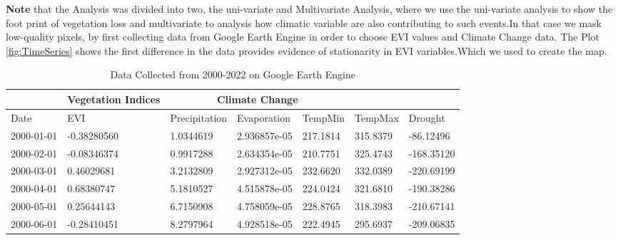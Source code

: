 \textbf{Note} that the Analysis was divided into two, the uni-variate and Multivariate Analysis, where we use the uni-variate analysis to show the foot print of vegetation loss and multivariate to analysis how climatic variable are also contributing to such events.In that case we mask low-quality pixels, by  first collecting data from Google Earth Engine in order to choose  EVI values and Climate Change data. The Plot \ref{fig:TimeSeries}  shows the first difference in the data provides evidence of stationarity in EVI variables.Which we used to create the map. 
\begin{table}[]
	\label{DataFrame}
	\caption{Data Collected from 2000-2022 on Google Earth Engine }
	\centering
	\small
	\addtolength{\tabcolsep}{-2pt}
	\begin{tabularx}{\textwidth}{@{}cllllll@{}}
		\toprule
		& \multicolumn{1}{c}{Vegetation Indices}   & \multicolumn{3}{c}{Climate Change}  \\ \midrule
		\multicolumn{1}{l}{Date} & \multicolumn{1}{l}{EVI} & \multicolumn{1}{l}{Precipitation} & \multicolumn{1}{l}{Evaporation} & \multicolumn{1}{l}{TempMin} & \multicolumn{1}{l}{TempMax} &\multicolumn{1}{l}{Drought}\\ \midrule
		
		
		2000-01-01&	-0.38280560&	1.0344619&	2.936857e-05&	217.1814&	315.8379&	-86.12496\\
		2000-02-01&	-0.08346374&	0.9917288&	2.634354e-05&	210.7751&	325.4743&	-168.35120\\
		2000-03-01&	0.46029681&	3.2132809&	2.927312e-05&	232.6620&	332.0389&	-220.69199\\
		2000-04-01&	0.68380747&	5.1810527&	4.515878e-05&	224.0424&	321.6810&	-190.38286\\
		2000-05-01&	0.25644143&	6.7150908&	4.758059e-05&	228.8765&	318.3983&	-210.67141\\
		2000-06-01&	-0.28410451&	8.2797964&	4.928518e-05&	222.4945&	295.6937&	-209.06835\\\bottomrule
		
	\end{tabularx}
\end{table}
